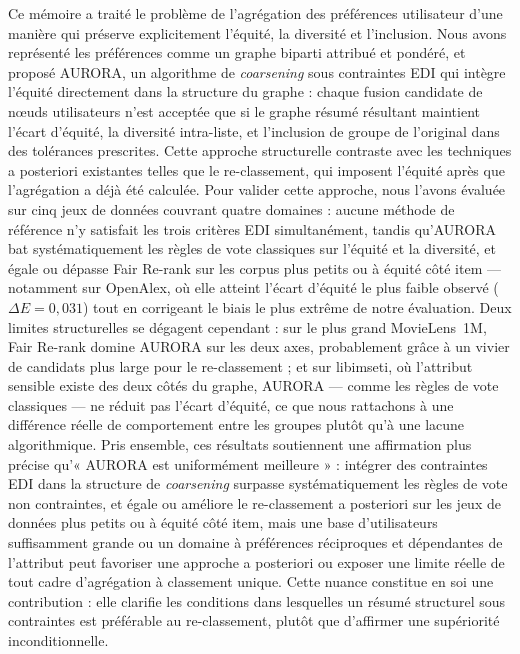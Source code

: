 \documentclass[12pt]{report}
\begin{document}
Ce mémoire a traité le problème de l'agrégation des préférences
utilisateur d'une manière qui préserve explicitement l'équité, la
diversité et l'inclusion. Nous avons représenté les préférences comme un
graphe biparti attribué et pondéré, et proposé AURORA, un algorithme de
\emph{coarsening} sous contraintes EDI qui intègre l'équité directement
dans la structure du graphe : chaque fusion candidate de nœuds
utilisateurs n'est acceptée que si le graphe résumé résultant maintient
l'écart d'équité, la diversité intra-liste, et l'inclusion de groupe de
l'original dans des tolérances prescrites. Cette approche structurelle
contraste avec les techniques a posteriori existantes telles que le
re-classement, qui imposent l'équité après que l'agrégation a déjà été
calculée. Pour valider cette approche, nous l'avons évaluée sur cinq
jeux de données couvrant quatre domaines : aucune méthode de référence
n'y satisfait les trois critères EDI simultanément, tandis qu'AURORA bat
systématiquement les règles de vote classiques
sur l'équité et la diversité, et égale ou dépasse Fair Re-rank sur les
corpus plus petits ou à équité côté item --- notamment sur OpenAlex, où
elle atteint l'écart d'équité le plus faible observé ($\Delta E =
0{,}031$) tout en corrigeant le biais le plus extrême de notre
évaluation. Deux limites structurelles se dégagent cependant : sur le
plus grand MovieLens~1M, Fair Re-rank domine AURORA sur les deux axes,
probablement grâce à un vivier de candidats plus large pour le
re-classement ; et sur libimseti, où l'attribut sensible existe des deux
côtés du graphe, AURORA --- comme les règles de vote classiques --- ne
réduit pas l'écart d'équité, ce que nous rattachons à une différence
réelle de comportement entre les groupes plutôt qu'à une lacune
algorithmique. Pris ensemble, ces résultats soutiennent une affirmation
plus précise qu'« AURORA est uniformément meilleure » : intégrer des
contraintes EDI dans la structure de \emph{coarsening} surpasse
systématiquement les règles de vote non contraintes, et égale ou
améliore le re-classement a posteriori sur les jeux de données plus
petits ou à équité côté item, mais une base d'utilisateurs suffisamment
grande ou un domaine à préférences réciproques et dépendantes de
l'attribut peut favoriser une approche a posteriori ou exposer une
limite réelle de tout cadre d'agrégation à classement unique. Cette
nuance constitue en soi une contribution : elle clarifie les conditions
dans lesquelles un résumé structurel sous contraintes est préférable au
re-classement, plutôt que d'affirmer une supériorité inconditionnelle.
\end{document}
